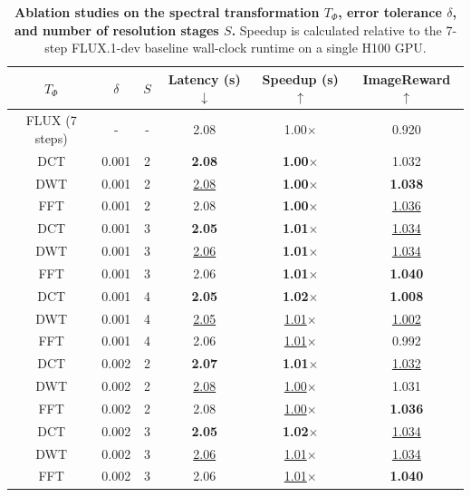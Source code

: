 \begin{table}[t!]
    \centering
    \caption{\textbf{Ablation studies on the spectral transformation $T_\Phi$, error tolerance $\delta$, and number of resolution stages $S$.} Speedup is calculated relative to the 7-step FLUX.1-dev baseline wall-clock runtime on a single H100 GPU.}
    \label{tab:ablation-quan}
    \centering
    \begin{tiny}
    \begin{tabular}{cccccc}
        \toprule
        $T_\Phi$ & $\delta$ & $S$ & Latency (s) $\downarrow$ & Speedup (s) $\uparrow$ & ImageReward $\uparrow$ \\
        \midrule
        FLUX (7 steps) & - & - & 2.08 & 1.00$\times$ & 0.920 \\
        \midrule
        DCT & 0.001 & 2 & \textbf{2.08} & \textbf{1.00$\times$} & 1.032 \\
        DWT & 0.001 & 2 & \underline{2.08} & \textbf{1.00$\times$} & \textbf{1.038} \\
        FFT & 0.001 & 2 & 2.08 & \textbf{1.00$\times$} & \underline{1.036} \\
        \midrule
        DCT & 0.001 & 3 & \textbf{2.05} & \textbf{1.01$\times$} & \underline{1.034} \\
        DWT & 0.001 & 3 & \underline{2.06} & \textbf{1.01$\times$} & \underline{1.034} \\
        FFT & 0.001 & 3 & 2.06 & \textbf{1.01$\times$} & \textbf{1.040} \\
        \midrule
        DCT & 0.001 & 4 & \textbf{2.05} & \textbf{1.02$\times$} & \textbf{1.008} \\
        DWT & 0.001 & 4 & \underline{2.05} & \underline{1.01$\times$} & \underline{1.002} \\
        FFT & 0.001 & 4 & 2.06 & \underline{1.01$\times$} & 0.992 \\
        \midrule
        DCT & 0.002 & 2 & \textbf{2.07} & \textbf{1.01$\times$} & \underline{1.032} \\
        DWT & 0.002 & 2 & \underline{2.08} & \underline{1.00$\times$} & 1.031 \\
        FFT & 0.002 & 2 & 2.08 & \underline{1.00$\times$} & \textbf{1.036} \\
        \midrule
        DCT & 0.002 & 3 & \textbf{2.05} & \textbf{1.02$\times$} & \underline{1.034} \\
        DWT & 0.002 & 3 & \underline{2.06} & \underline{1.01$\times$} & \underline{1.034} \\
        FFT & 0.002 & 3 & 2.06 & \underline{1.01$\times$} & \textbf{1.040} \\

\end{tabular}
\end{tiny}
\end{table}
